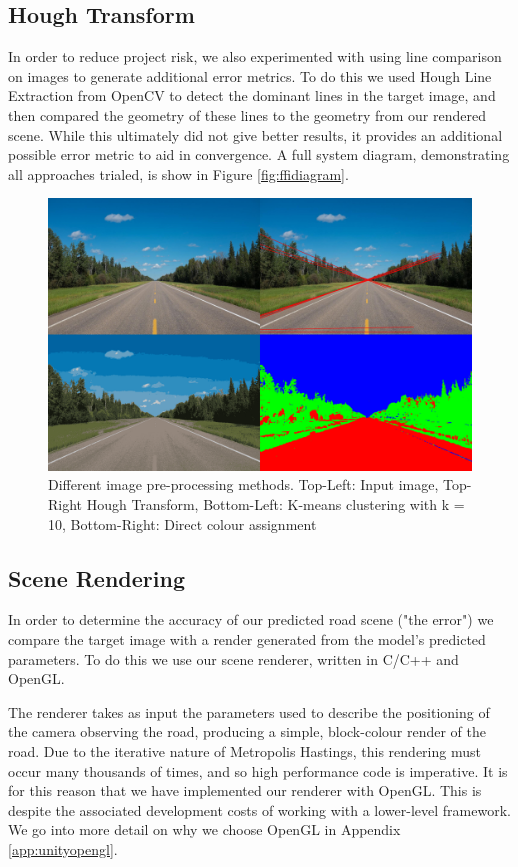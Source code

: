 \documentclass[conference]{IEEEtran}
\begin{document}
\subsection*{Hough Transform}
In order to reduce project risk, we also experimented with using line comparison on images to generate additional error metrics. To do this we used Hough Line Extraction from OpenCV to detect the dominant lines in the target image, and then compared the geometry of these lines to the geometry from our rendered scene. While this ultimately did not give better results, it provides an additional possible error metric to aid in convergence. A full system diagram, demonstrating all approaches trialed, is show in Figure \ref{fig:ffidiagram}.

\begin{figure}[h]
    \centering
    \includegraphics[width=\linewidth]{images/preprocessing.png}
    \caption{Different image pre-processing methods. Top-Left: Input image, Top-Right Hough Transform, Bottom-Left: K-means clustering with k = 10, Bottom-Right: Direct colour assignment}
    \label{fig:kmeans}
\end{figure}

\subsection*{Scene Rendering}
In order to determine the accuracy of our predicted road scene ("the error") we compare the target image with a render generated from the model's predicted parameters. To do this we use our scene renderer, written in C/C++ and OpenGL.

The renderer takes as input the parameters used to describe the positioning of the camera observing the road, producing a simple, block-colour render of the road. Due to the iterative nature of Metropolis Hastings, this rendering must occur many thousands of times, and so high performance code is imperative. It is for this reason that we have implemented our renderer with OpenGL. This is despite the associated development costs of working with a lower-level framework. We go into more detail on why we choose OpenGL in Appendix \ref{app:unityopengl}.
\end{document}
